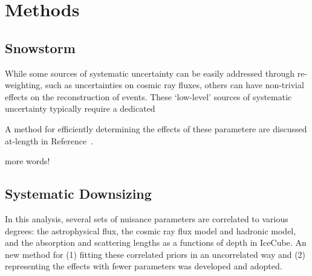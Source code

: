 \documentclass[main.tex]{subfiles}
\begin{document}
\section{Methods}
\subsection{Snowstorm}
While some sources of systematic uncertainty can be easily addressed through re-weighting, such as uncertainties on cosmic ray fluxes, others can have non-trivial effects on the reconstruction of events. 
These `low-level' sources of systematic uncertainty typically require a dedicated 

A method for efficiently determining the effects of these parametere are discussed at-length in Reference~\cite{Aartsen_2019_snow}.


more words! 

\subsection{Systematic Downsizing}\label{sect:down}

In this analysis, several sets of nuisance parameters are correlated to various degrees: the astrophysical flux, the cosmic ray flux model and hadronic model, and the absorption and scattering lengths as a functions of depth in IceCube. 
An new method for (1) fitting these correlated priors in an uncorrelated way and (2) representing the effects with fewer parameters was developed and adopted. 
\end{document}
